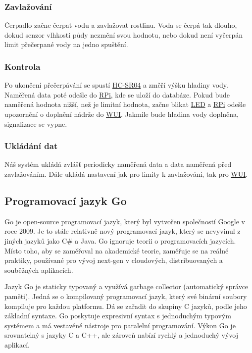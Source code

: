 \documentclass[czech,12pt,a4paper]{article}
\begin{document}
\subsubsection{Zavlažování}

Čerpadlo začne čerpat vodu a zavlažovat rostlinu. Voda se čerpá tak dlouho, dokud senzor vlhkosti půdy nezmění svou hodnotu, nebo dokud není vyčerpán limit přečerpané vody na jedno spuštění.

\subsubsection{Kontrola}

Po ukončení přečerpávání se spustí \underline{\ac{HC-SR04}} a změří výšku hladiny vody. Naměřená data poté odešle do \underline{\ac{RPi}}, kde se uloží do databáze. Pokud bude naměřená hodnota nižší, než je limitní hodnota, začne blikat \underline{\ac{LED}} a \underline{\ac{RPi}} odešle upozornění o doplnění nádrže do \underline{\ac{WUI}}. Jakmile bude hladina vody doplněna, signalizace se vypne.

\subsubsection{Ukládání dat}

Náš systém ukládá zvlášť periodicky naměřená data a data naměřená před zavlažováním. Dále ukládá nastavení jak pro limity k zavlažování, tak pro \underline{\ac{WUI}}.

\subsection{Programovací jazyk Go}

Go je open-source programovací jazyk, který byl vytvořen společností Google v roce 2009. Je to stále relativně nový programovací jazyk, který se nevyvinul z jiných jazyků jako C\# a Java. Go ignoruje teorii o programovacích jazycích. Místo toho, aby se zaměřoval na akademické teorie, zaměřuje se na reálné praktiky, používané pro vývoj next-gen v cloudových, distribuovaných a souběžných aplikacích.

Jazyk Go je staticky typovaný a využívá garbage collector (automatický správce paměti). Jedná se o kompilovaný programovací jazyk, který své binární soubory kompiluje pro každou platformu. Dá se zařadit do skupiny C jazyků, podle jeho základní syntaxe. Go poskytuje expresivní syntax s jednoduchým typovým systémem a má vestavěné nástroje pro paralelní programování. Výkon Go je srovnatelný s jazyky C a C++, ale zároveň nabízí rychlý a jednoduchý vývoj aplikací.
\end{document}
